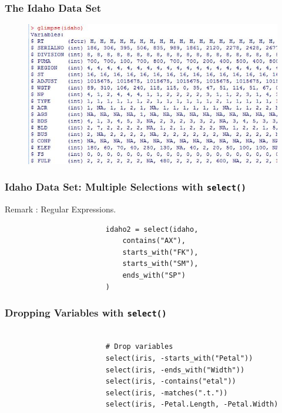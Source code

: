 \documentclass{beamer}
\begin{document}
			\begin{frame}[fragile]
				\frametitle{The Idaho Data Set}
					
\begin{figure}
\centering
\includegraphics[width=1.2\linewidth]{images/idahoglimpse}

\end{figure}
					
				\end{frame}
				\begin{frame}[fragile]
					\frametitle{ Idaho Data Set: Multiple Selections with \texttt{select()} }
					
					Remark : Regular Expressions.
					\begin{framed}
						\begin{verbatim}
						idaho2 = select(idaho,
						    contains("AX"),
						    starts_with("FK"),
						    starts_with("SM"),
						    ends_with("SP") 
						)
						\end{verbatim}
					\end{framed}
					
				\end{frame}
				\begin{frame}[fragile]
					\frametitle{ Dropping Variables with \texttt{select()} }
					\begin{framed}
						\begin{verbatim}	
						
						# Drop variables
						select(iris, -starts_with("Petal"))
						select(iris, -ends_with("Width"))
						select(iris, -contains("etal"))
						select(iris, -matches(".t."))
						select(iris, -Petal.Length, -Petal.Width)
						\end{verbatim}
					\end{framed}
					
				\end{frame}
				
\end{document}
